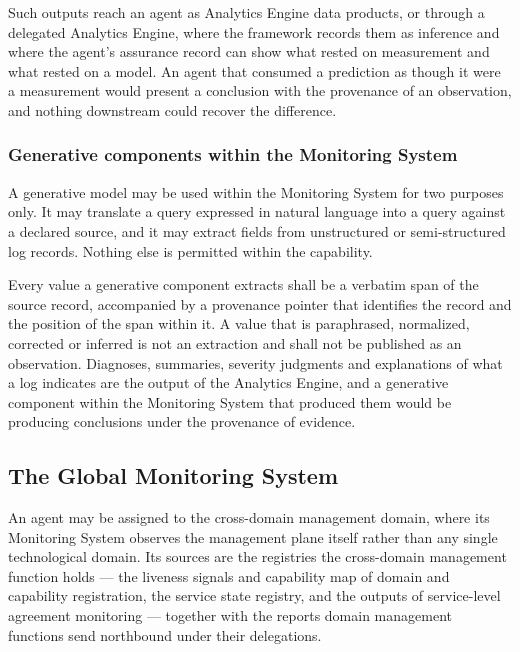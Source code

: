 Such outputs reach an agent as Analytics Engine data products, or
through a delegated Analytics Engine, where the framework records them
as inference and where the agent's assurance record can show what rested
on measurement and what rested on a model. An agent that consumed a
prediction as though it were a measurement would present a conclusion
with the provenance of an observation, and nothing downstream could
recover the difference.

\hypertarget{generative-components-within-the-monitoring-system}{%
\subsubsection{Generative components within the Monitoring System}\label{generative-components-within-the-monitoring-system}}

A generative model may be used within the Monitoring System for two
purposes only. It may translate a query expressed in natural language
into a query against a declared source, and it may extract fields from
unstructured or semi-structured log records. Nothing else is permitted
within the capability.

Every value a generative component extracts shall be a verbatim span of
the source record, accompanied by a provenance pointer that identifies
the record and the position of the span within it. A value that is
paraphrased, normalized, corrected or inferred is not an extraction and
shall not be published as an observation. Diagnoses, summaries, severity
judgments and explanations of what a log indicates are the output of the
Analytics Engine, and a generative component within the Monitoring
System that produced them would be producing conclusions under the
provenance of evidence.

\hypertarget{the-global-monitoring-system}{%
\subsection{The Global Monitoring System}\label{the-global-monitoring-system}}

An agent may be assigned to the cross-domain management domain, where
its Monitoring System observes the management plane itself rather than
any single technological domain. Its sources are the registries the
cross-domain management function holds --- the liveness signals and
capability map of domain and capability registration, the service state
registry, and the outputs of service-level agreement monitoring ---
together with the reports domain management functions send northbound
under their delegations.

